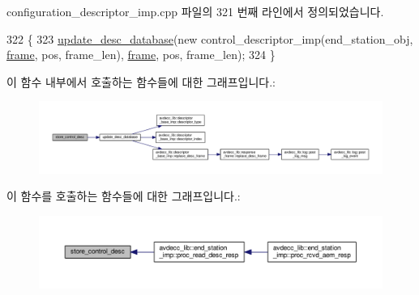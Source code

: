 configuration\+\_\+descriptor\+\_\+imp.\+cpp 파일의 321 번째 라인에서 정의되었습니다.


\begin{DoxyCode}
322 \{
323     \hyperlink{classavdecc__lib_1_1configuration__descriptor__imp_a98445251711b644b6da09d2354003778}{update\_desc\_database}(\textcolor{keyword}{new} control\_descriptor\_imp(end\_station\_obj, 
      \hyperlink{gst__avb__playbin_8c_ac8e710e0b5e994c0545d75d69868c6f0}{frame}, pos, frame\_len), \hyperlink{gst__avb__playbin_8c_ac8e710e0b5e994c0545d75d69868c6f0}{frame}, pos, frame\_len);
324 \}
\end{DoxyCode}


이 함수 내부에서 호출하는 함수들에 대한 그래프입니다.\+:
\nopagebreak
\begin{figure}[H]
\begin{center}
\leavevmode
\includegraphics[width=350pt]{classavdecc__lib_1_1configuration__descriptor__imp_ac115c63b08098c457ad25c5e9f2c1a23_cgraph}
\end{center}
\end{figure}




이 함수를 호출하는 함수들에 대한 그래프입니다.\+:
\nopagebreak
\begin{figure}[H]
\begin{center}
\leavevmode
\includegraphics[width=350pt]{classavdecc__lib_1_1configuration__descriptor__imp_ac115c63b08098c457ad25c5e9f2c1a23_icgraph}
\end{center}
\end{figure}



